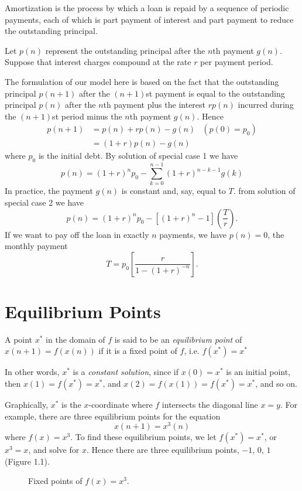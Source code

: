 \begin{enumerate}
        Amortization is the process by which a loan is repaid by a sequence of periodic payments, each of which is part payment of interest and part payment to reduce the outstanding principal.

        Let $p(n)$ represent the outstanding principal after the $n$th payment $g(n)$. Suppose that interest charges compound at the rate $r$ per payment period.

        The formulation of our model here is based on the fact that the outstanding principal $p(n+1)$ after the $(n+1)$st payment is equal to the outstanding principal $p(n)$ after the $n$th payment plus the interest $rp(n)$ incurred during the $(n+1)$st period minus the $n$th payment $g(n)$. Hence
        \begin{align*}
            p(n+1) & =p(n)+rp(n)-g(n) & \left(p(0)=p_0\right) \\
                   & =(1+r)p(n)-g(n) &
        \end{align*}
        where $p_0$ is the initial debt. By solution of special case 1 we have
        \[p(n)=(1+r)^np_0-\sum_{k=0}^{n-1} (1+r)^{n-k-1}g(k)\]
        In practice, the payment $g(n)$ is constant and, say, equal to $T$. from solution of special case 2 we have
        \[p(n)=(1+r)^np_0-[(1+r)^n-1](\frac{T}{r}).\]
        If we want to pay off the loan in exactly $n$ payments, we have $p(n)=0$, the monthly payment
        \[T=p_0\left[\frac{r}{1-(1+r)^{-n}}\right].\]
\end{enumerate}

\section{Equilibrium Points}
\begin{definition}
    A point $x^*$ in the domain of $f$ is said to be an \textit{equilibrium point} of $x(n+1)=f(x(n))$ if it is a fixed point of $f$, i.e. $f(x^*)=x^*$
\end{definition}

In other words, $x^*$ is a \textit{constant solution}, since if $x(0)=x^*$ is an initial point, then $x(1)=f(x^*)=x^*$, and $x(2)=f(x(1))=f(x^*)=x^*$, and so on.

Graphically, $x^*$ is the $x$-coordinate where $f$ intersects the diagonal line $x=y$. For example, there are three equilibrium points for the equation
\[x(n+1)=x^3(n)\]
where $f(x)=x^3$. To find these equilibrium points, we let $f(x^*)=x^*$, or $x^3=x$, and solve for $x$. Hence there are three equilibrium points, $-1$, $0$, $1$ (Figure 1.1).
\begin{figure}[H]
    \centering
    \caption{Fixed points of $f(x)=x^3$.}
\end{figure}

